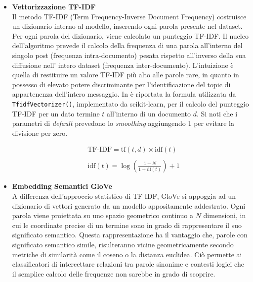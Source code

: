 \documentclass[12pt, a4paper, twoside]{article}
\numberwithin{table}{section}
\begin{document}
    \begin{itemize}
        
        \item \textbf{Vettorizzazione TF-IDF} \\
        Il metodo TF-IDF (Term Frequency-Inverse Document Frequency) costruisce un dizionario interno al modello,
        inserendo ogni parola presente nel dataset. Per ogni parola del dizionario,
        viene calcolato un punteggio TF-IDF. Il nucleo dell'algoritmo prevede il calcolo della frequenza di una parola
        all'interno del singolo post (frequenza \mbox{intra-documento}) pesata rispetto all'inverso della sua diffusione nell'
        intero dataset (frequenza \mbox{inter-documento}). L'intuizione è quella di restituire un valore TF-IDF più alto 
        alle parole rare, in quanto in possesso di elevato potere discriminante per l'identificazione del topic di 
        appartenenza dell'intero messaggio. In  è riportata la formula utilizzata da \texttt{TfidfVectorizer()}, implementato da scikit-learn, per il calcolo del punteggio TF-IDF per un dato termine $t$ all'interno di un documento $d$. Si noti che i parametri di \textit{default} prevedono lo \textit{smoothing} aggiungendo $1$ per evitare la divisione per zero.

        \begin{equation}
        \begin{split}
            &\text{TF-IDF} = \text{tf}(t,d) \times \text{idf}(t) \\ \\
            &\text{idf}(t) = \log\left(\frac{1+N}{1+\text{df}(t)}\right)+1
        \end{split}
        \label{eq:tf-idf}
        \end{equation}

        \vspace{0.9cm}

        \item \textbf{Embedding Semantici GloVe} \\
        A differenza dell'approccio statistico di TF-IDF, GloVe si appoggia ad un dizionario 
        di vettori generato da un modello appositamente addestrato. Ogni parola viene proiettata su uno spazio geometrico continuo a $N$ dimensioni,
        in cui le coordinate precise di un termine sono in grado di rappresentare il suo significato semantico. 
        Questa rappresentazione ha il vantaggio che, parole con significato semantico simile, risulteranno vicine geometricamente secondo metriche di similarità come il coseno o la distanza euclidea. Ciò permette ai classificatori di intercettare relazioni tra parole sinonime e contesti
        logici che il semplice calcolo delle frequenze non sarebbe in grado di scoprire.

    \end{itemize}
\end{document}
